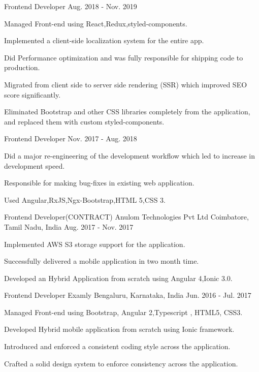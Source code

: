 \begin{cventries}
  \cventry
    {Frontend Developer}
    {}
    {}
    {Aug. 2018 - Nov. 2019}
    {
      \begin{cvitems}
        \item { Managed Front-end using React,Redux,styled-components.}
        \item { Implemented a client-side localization system for the entire app.}
        \item { Did Performance optimization and was fully responsible for shipping code to production.}
        \item { Migrated from client side to server side rendering (SSR) which improved SEO score
        significantly.}
        \item { Eliminated Bootstrap and other CSS libraries completely from the application,
        and replaced them with custom styled-components.}
        \end{cvitems}
    }

  \cventry
    {Frontend Developer}
    {}
    {}
    {Nov. 2017 - Aug. 2018}
    {
      \begin{cvitems}
        \item {Did a major re-engineering of the development workflow which led to
        increase in development speed.}
        \item {Responsible for making bug-fixes in existing web application.}
        \item {Used Angular,RxJS,Ngx-Bootstrap,HTML 5,CSS 3.}
        \end{cvitems}
    }

    
  \cventry
    {Frontend Developer(CONTRACT)}
    {Anulom Technologies Pvt Ltd}
    {Coimbatore, Tamil Nadu, India}
    {Aug. 2017 - Nov. 2017}
    {
      \begin{cvitems}
        \item { Implemented AWS S3 storage support for the application.}
        \item { Successfully delivered a mobile application in two month time.}    
        \item { Developed an Hybrid Application from scratch using Angular 4,Ionic 3.0.}
        \end{cvitems}
    }

  \cventry
    {Frontend Developer}
    {Examly}
    {Bengaluru, Karnataka, India}
    {Jun. 2016 - Jul. 2017}
    {
      \begin{cvitems}
        \item {Managed Front-end using Bootstrap, Angular 2,Typescript , HTML5, CSS3.}
        \item {Developed Hybrid mobile application from scratch using Ionic framework.}
        \item {Introduced and enforced a consistent coding style across the application.}
        \item {Crafted a solid design system to enforce consistency across the application.}
      \end{cvitems}
    }


\end{cventries}
